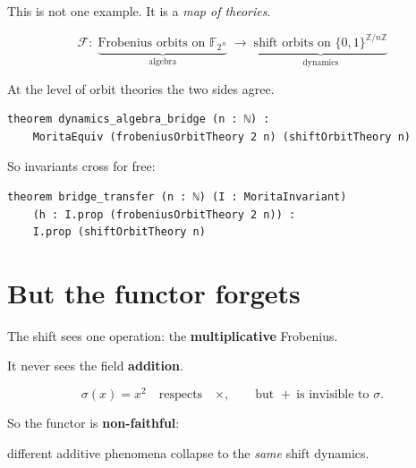 \documentclass[11pt]{article}
\begin{document}
\bigskip

This is not one example. It is a \emph{map of theories}.

\bigskip

\[
  \mathcal{F} : \;
  \underbrace{\text{Frobenius orbits on } \mathbb{F}_{2^{\,n}}}_{\text{algebra}}
  \;\longrightarrow\;
  \underbrace{\text{shift orbits on } \{0,1\}^{\mathbb{Z}/n\mathbb{Z}}}_{\text{dynamics}}
\]

\bigskip

At the level of orbit theories the two sides agree.

\bigskip

\begin{lstlisting}
theorem dynamics_algebra_bridge (n : ℕ) :
    MoritaEquiv (frobeniusOrbitTheory 2 n) (shiftOrbitTheory n)
\end{lstlisting}

\bigskip

So invariants cross for free:

\begin{lstlisting}
theorem bridge_transfer (n : ℕ) (I : MoritaInvariant)
    (h : I.prop (frobeniusOrbitTheory 2 n)) :
    I.prop (shiftOrbitTheory n)
\end{lstlisting}

\newpage


\section{But the functor forgets}

\bigskip

The shift sees one operation: the \textbf{multiplicative} Frobenius.

\bigskip

It never sees the field \textbf{addition}.

\bigskip

\[
  \sigma(x) = x^{2}
  \quad\text{respects}\quad \times,
  \qquad
  \text{but } +\ \text{is invisible to } \sigma .
\]

\bigskip

So the functor is \textbf{non-faithful}:

\bigskip

different additive phenomena collapse to the \emph{same} shift dynamics.

\bigskip


\newpage
\end{document}
